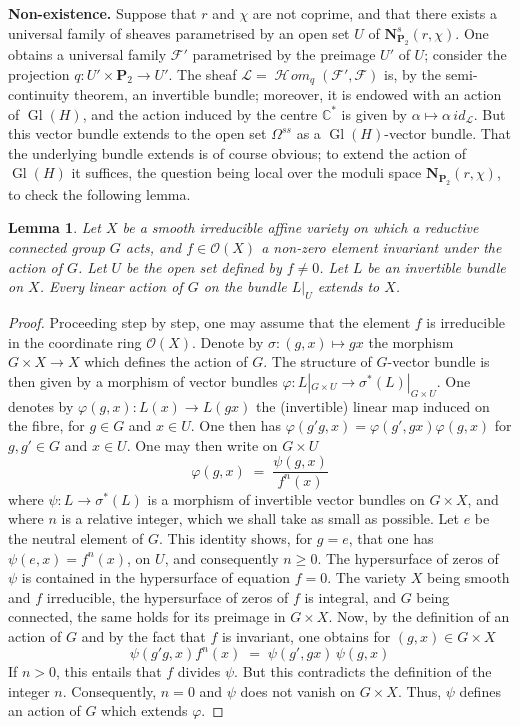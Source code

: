 \documentclass[12pt,english]{smfart}%
\theoremstyle{plain}
\newtheorem{lemma}[theorem]{Lemma}
\theoremstyle{definition}
\theoremstyle{remark}
\newcommand{\PP}{\mathbf{P}}
\newcommand{\CC}{\mathbb{C}}
\newcommand{\Oh}{\mathcal{O}}
\DeclareMathOperator{\Gl}{Gl}
\newcommand{\Homsh}{\mathop{\mathcal{H}\!\mathit{om}}\nolimits}
\newcommand{\origpage}[1]{\marginnote{\scriptsize\itshape p.~#1}}
\begin{document}
\origpage{655}
\medskip
\noindent\textbf{Non-existence.} Suppose that $r$ and $\chi$ are not coprime, and that there exists a universal family of sheaves parametrised by an open set $U$ of $\mathbf{N}^{s}_{\PP_{2}}(r,\chi)$. One obtains a universal family $\mathscr{F}'$ parametrised by the preimage $U'$ of $U$; consider the projection $q:U'\times\PP_{2}\to U'$. The sheaf $\mathscr{L}=\Homsh_{q}(\mathscr{F}',\mathscr{F})$ is, by the semi-continuity theorem, an invertible bundle; moreover, it is endowed with an action of $\Gl(H)$, and the action induced by the centre $\CC^{*}$ is given by $\alpha\mapsto\alpha\, id_{\mathscr{L}}$. But this vector bundle extends to the open set $\Omega^{ss}$ as a $\Gl(H)$-vector bundle. That the underlying bundle extends is of course obvious; to extend the action of $\Gl(H)$ it suffices, the question being local over the moduli space $\mathbf{N}_{\PP_{2}}(r,\chi)$, to check the following lemma.

\begin{lemma}\label{lem:extend-action}
Let $X$ be a smooth irreducible affine variety on which a reductive connected group $G$ acts, and $f\in\Oh(X)$ a non-zero element invariant under the action of $G$. Let $U$ be the open set defined by $f\neq 0$. Let $L$ be an invertible bundle on $X$. Every linear action of $G$ on the bundle $L|_{U}$ extends to $X$.
\end{lemma}

\begin{proof}
Proceeding step by step, one may assume that the element $f$ is irreducible in the coordinate ring $\Oh(X)$. Denote by $\sigma:(g,x)\mapsto gx$ the morphism $G\times X\to X$ which defines the action of $G$. The structure of $G$-vector bundle is then given by a morphism of vector bundles $\varphi:L|_{G\times U}\to\sigma^{*}(L)|_{G\times U}$. One denotes by $\varphi(g,x):L(x)\to L(gx)$ the (invertible) linear map induced on the fibre, for $g\in G$ and $x\in U$. One then has $\varphi(g'g,x)=\varphi(g',gx)\varphi(g,x)$ for $g,g'\in G$ and $x\in U$. One may then write on $G\times U$
\[
\varphi(g,x) \;=\; \frac{\psi(g,x)}{f^{n}(x)}
\]
where $\psi:L\to\sigma^{*}(L)$ is a morphism of invertible vector bundles on $G\times X$, and where $n$ is a relative integer, which we shall take as small as possible. Let $e$ be the neutral element of $G$. This identity shows, for $g=e$, that one has $\psi(e,x)=f^{n}(x)$, on $U$, and consequently $n\geq 0$. The hypersurface of zeros of $\psi$ is contained in the hypersurface of equation $f=0$. The variety $X$ being smooth and $f$ irreducible, the hypersurface of zeros of $f$ is integral, and $G$ being connected, the same holds for its preimage in $G\times X$. Now, by the definition of an action of $G$ and by the fact that $f$ is invariant, one obtains for $(g,x)\in G\times X$
\[
\psi(g'g,x) f^{n}(x) \;=\; \psi(g',gx)\,\psi(g,x)
\]
If $n>0$, this entails that $f$ divides $\psi$. But this contradicts the definition of the integer $n$. Consequently, $n=0$ and $\psi$ does not vanish on $G\times X$. Thus, $\psi$ defines an action of $G$ which extends $\varphi$.
\end{proof}
\end{document}
